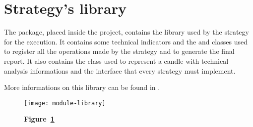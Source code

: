 \section{Strategy's library}\label{sec:library}

The  package, placed inside the  project,
contains the library used by the strategy for the execution. It contains some
technical indicators and the  and  classes used to
register all the operations made by the strategy and to generate the final
report. It also contains the  class used to represent a candle with
technical analysis informations and the  interface that
every strategy must implement.

More informations on this library can be found in .

\begin{landscape}
	\begin{figure}[!ht]
		\texttt{[image: module-library]}
		\caption*{\textbf{Figure~\ref{fig:library}}}
		\captionlistentry{}\label{fig:library}
	\end{figure}
\end{landscape}

